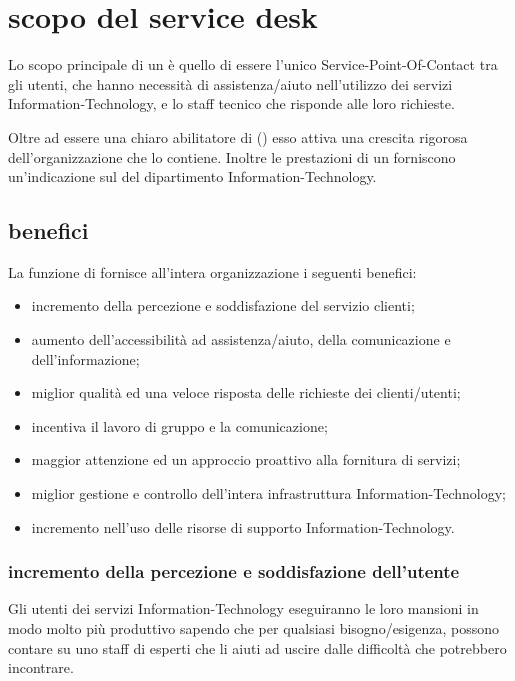 %
%
\section[Scopo del Service Desk]{scopo del service desk}
\label{sd-scope}
Lo scopo principale di un  è quello di essere l'unico \ac{Service-Point-Of-Contact} tra gli utenti, che hanno necessità di assistenza/aiuto nell'utilizzo dei servizi \acs{Information-Technology}, e lo staff tecnico che risponde alle loro richieste.

Oltre ad essere una chiaro abilitatore di  () esso attiva una crescita rigorosa dell'organizzazione che lo contiene. Inoltre le prestazioni di un  forniscono un'indicazione sul  del dipartimento \acs{Information-Technology}.

\subsection[Benefici]{benefici}
\label{sd-benefits}
La funzione di  fornisce all'intera organizzazione i seguenti benefici:

\begin{itemize}
\item{incremento della percezione e soddisfazione del servizio clienti;}
\item{aumento dell'accessibilità ad assistenza/aiuto, della comunicazione e dell'informazione;}
\item{miglior qualità ed una veloce risposta delle richieste dei clienti/utenti;}
\item{incentiva il lavoro di gruppo e la comunicazione;}
\item{maggior attenzione ed un approccio proattivo alla fornitura di servizi;}
\item{miglior gestione e controllo dell'intera infrastruttura \acs{Information-Technology};}
\item{incremento nell'uso delle risorse di supporto \acs{Information-Technology}.}
\end{itemize}

\subsubsection[Incremento della percezione e soddisfazione dell'utente]{incremento della percezione e soddisfazione dell'utente}
Gli utenti dei servizi \acs{Information-Technology} eseguiranno le loro mansioni in modo molto più produttivo sapendo che per qualsiasi bisogno/esigenza, possono contare su uno staff di esperti che li aiuti ad uscire dalle difficoltà che potrebbero incontrare.

